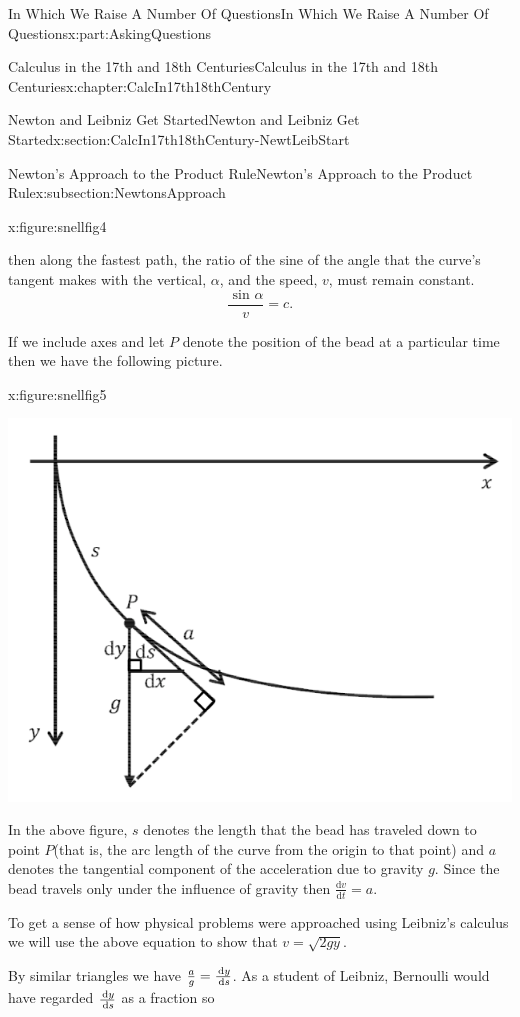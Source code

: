 \documentclass[oneside,10pt,]{book}
\numberwithin{equation}{section}
\newcommand{\dx}[1]{\,{\rm d}#1}
\newcommand{\dfdx}[2]{\frac{\text{d}{#1}}{\text{d}{#2}}}
\begin{document}
\begin{partptx}{In Which We Raise A Number Of Questions}{}{In Which We Raise A Number Of Questions}{}{}{x:part:AskingQuestions}
\begin{chapterptx}{Calculus in the 17th and 18th Centuries}{}{Calculus in the 17th and 18th Centuries}{}{}{x:chapter:CalcIn17th18thCentury}
\begin{sectionptx}{Newton and Leibniz Get Started}{}{Newton and Leibniz Get Started}{}{}{x:section:CalcIn17th18thCentury-NewtLeibStart}
\begin{subsectionptx}{Newton's Approach to the Product Rule}{}{Newton's Approach to the Product Rule}{}{}{x:subsection:NewtonsApproach}
\begin{figureptx}{}{x:figure:snellfig4}{}
\begin{image}{0.125}{0.75}{0.125}
\end{image}%
\tcblower
\end{figureptx}%
then along the fastest path, the ratio of the sine of the angle that the curve's tangent makes with the vertical, \(\alpha\), and the speed, \(v\), must remain constant.%
\begin{equation*}
\frac{\text{ sin } \alpha}{v}=c\text{.}
\end{equation*}
%
\par
If we include axes and let \(P\) denote the position of the bead at a particular time then we have the following picture.%
\begin{figureptx}{}{x:figure:snellfig5}{}%
\begin{image}{0.125}{0.75}{0.125}%
\includegraphics[width=\linewidth]{images/snellfig5.png}
\end{image}%
\tcblower
\end{figureptx}%
In the above figure, \(s\) denotes the length that the bead has traveled down to point \(P\)(that is, the arc length of the curve from the origin to that point) and \(a\) denotes the tangential component of the acceleration due to gravity \(g\).  Since the bead travels only under the influence of gravity then \(\dfdx{v}{t}=a\).%
\par
To get a sense of how physical problems were approached using Leibniz's calculus we will use the above equation to show that \(v=\sqrt{2gy}\).%
\par
By similar triangles we have \(\frac{a}{g}=\frac{\dx{ y}}{\dx{ s}}\). As a student of Leibniz, Bernoulli would have regarded \(\frac{\dx{ y}}{\dx{ s}}\) as a fraction so%

\end{subsectionptx}
\end{sectionptx}
\end{chapterptx}
\end{partptx}
\end{document}
